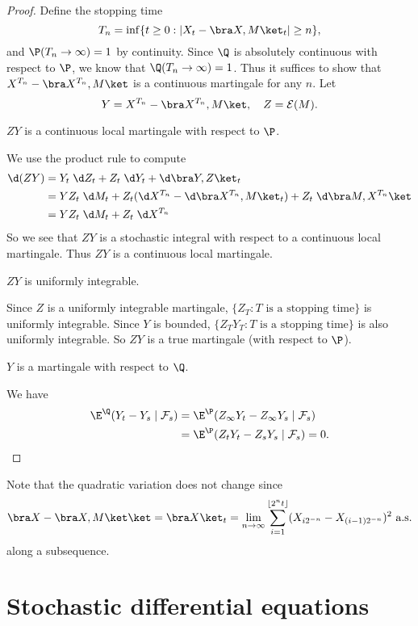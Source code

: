 \documentclass[a4paper]{article}
\begin{document}
\begin{proof}
  Define the stopping time
  \[
    T_n = \inf\{ t \geq 0: |X_t - \bra X, M\ket_t| \geq n\},
  \]
  and $\P(T_n \to \infty) = 1$ by continuity. Since $\Q$ is absolutely continuous with respect to $\P$, we know that $\Q(T_n \to \infty) = 1$. Thus it suffices to show that $X^{T_n} - \bra X^{T_n}, M\ket$ is a continuous martingale for any $n$. Let
  \[
    Y = X^{T_n} - \bra X^{T_n}, M\ket,\quad Z = \mathcal{E}(M).
  \]
  \begin{claim}
    $ZY$ is a continuous local martingale with respect to $\P$.
  \end{claim}
  We use the product rule to compute
  \begin{align*}
    \d (ZY) &= Y_t \;\d Z_t + Z_t \;\d Y_t + \d \bra Y, Z\ket_t\\
    &= Y Z_t \;\d M_t + Z_t (\d X^{T_n} - \d \bra X^{T_n}, M\ket_t) + Z_t \;\d \bra M, X^{T_n}\ket\\
    &= Y Z_t \;\d M_t + Z_t\;\d X^{T_n}
  \end{align*}
  So we see that $ZY$ is a stochastic integral with respect to a continuous local martingale. Thus $ZY$ is a continuous local martingale.

  \begin{claim}
    $ZY$ is uniformly integrable.
  \end{claim}
  Since $Z$ is a uniformly integrable martingale, $\{Z_T: T\text{ is a stopping time}\}$ is uniformly integrable. Since $Y$ is bounded, $\{Z_T Y_T: T\text{ is a stopping time}\}$ is also uniformly integrable. So $ZY$ is a true martingale (with respect to $\P$).

  \begin{claim}
    $Y$ is a martingale with respect to $\Q$.
  \end{claim}
  We have
  \begin{align*}
    \E^{\Q}(Y_t - Y_s \mid \mathcal{F}_s) &= \E^\P(Z_\infty Y_t - Z_\infty Y_s \mid \mathcal{F}_s)\\
    &= \E^{\P} (Z_t Y_t - Z_s Y_s \mid \mathcal{F}_s) = 0.\qedhere
  \end{align*}
\end{proof}
Note that the quadratic variation does not change since
\[
  \bra X - \bra X, M\ket \ket = \bra X \ket_t = \lim_{n \to \infty} \sum_{i = 1}^{\lfloor 2^n t \rfloor} (X_{i 2^{-n}} - X_{(i - 1)2^{-n}})^2\text{ a.s.}
\]
along a subsequence.

\section{Stochastic differential equations}
\end{document}
